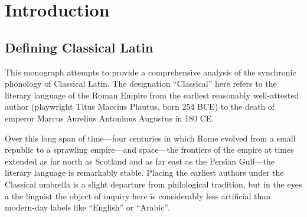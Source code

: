 \chapter{Introduction}
\label{introduction}

\section{Defining Classical Latin}

This monograph attempts to provide a comprehensive analysis of the synchronic phonology of Classical Latin.
The designation ``Classical'' here refers to the literary language of the Roman Empire from the earliest reasonably well-attested author (playwright Titus Maccius Plautus, born 254 BCE) to the death of emperor Marcus Aurelius Antoninus Augustus in 180 CE.

Over this long span of time---four centuries in which Rome evolved from a small republic to a sprawling empire---and space---the frontiers of the empire at times extended as far north as Scotland and as far east as the Persian Gulf---the literary language is remarkably stable.
Placing the earliest authors under the Classical umbrella is a slight departure from philological tradition, but in the eyes a the linguist the object of inquiry here is considerably less artificial than modern-day labels like ``English'' or ``Arabic''.

